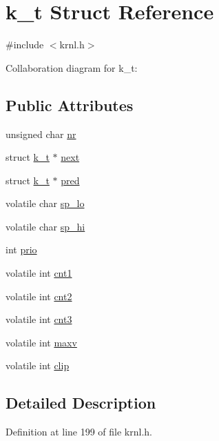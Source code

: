\hypertarget{structk__t}{}\section{k\+\_\+t Struct Reference}
\label{structk__t}


{\ttfamily \#include $<$krnl.\+h$>$}



Collaboration diagram for k\+\_\+t\+:
\subsection*{Public Attributes}
\begin{DoxyCompactItemize}
\item 
unsigned char \hyperlink{structk__t_abc0705694abb02c6005759d8ba66f35e}{nr}
\item 
struct \hyperlink{structk__t}{k\+\_\+t} $\ast$ \hyperlink{structk__t_ab1bd22ca23083ad81771ed998437fdfc}{next}
\item 
struct \hyperlink{structk__t}{k\+\_\+t} $\ast$ \hyperlink{structk__t_a600d8611c0af5f63b647ab12d219e0fb}{pred}
\item 
volatile char \hyperlink{structk__t_a1e6a2845b26a85e548e64a8ae310d7ac}{sp\+\_\+lo}
\item 
volatile char \hyperlink{structk__t_acb129ee9a4e02ae9c68d07c72c0db02d}{sp\+\_\+hi}
\item 
int \hyperlink{structk__t_a024120239a208b97bf2fcd17b9534182}{prio}
\item 
volatile int \hyperlink{structk__t_a7ef04bafaf2e57965dfa0c8a1d14d124}{cnt1}
\item 
volatile int \hyperlink{structk__t_a7ae00f43d917f25200fffd1a8defe5ef}{cnt2}
\item 
volatile int \hyperlink{structk__t_aec4d7232788478d29abb708ca07f6796}{cnt3}
\item 
volatile int \hyperlink{structk__t_ab5c4013797f848b7f3d306c8b12375b0}{maxv}
\item 
volatile int \hyperlink{structk__t_ad58455e7feb435218e12629a6b8321b9}{clip}
\end{DoxyCompactItemize}


\subsection{Detailed Description}


Definition at line 199 of file krnl.\+h.



